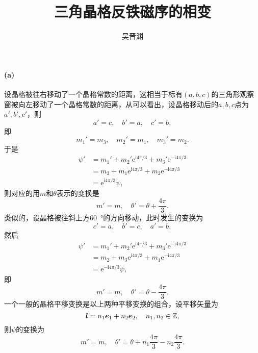 \documentclass[hyperref, UTF8, a4paper]{ctexart}
\title{三角晶格反铁磁序的相变}
\author{吴晋渊}
\newcommand*{\ii}{\mathrm{i}}
\newcommand*{\ee}{\mathrm{e}}
\begin{document}
\maketitle

\paragraph{(a)} 设晶格被往右移动了一个晶格常数的距离，这相当于标有$(a, b, c)$的三角形观察窗被向左移动了一个晶格常数的距离，从可以看出，设晶格移动后的$a, b, c$点为$a', b', c'$，则
\[
    a' = c, \quad b' = a, \quad c' = b,
\]
即
\[
    m_1' = m_3, \quad m_2' = m_1, \quad m_3' = m_2.
\]
于是
\[
    \begin{aligned}
        \psi' &= m_1' + m_2' \ee^{\ii 4 \pi / 3} + m_3' \ee^{- \ii 4 \pi / 3} \\
        &= m_3 + m_1 \ee^{\ii 4 \pi / 3} + m_2 \ee^{- \ii 4 \pi / 3} \\
        &= \ee^{\ii 4 \pi / 3} \psi,
    \end{aligned}
\]
则对应的用$m$和$\theta$表示的变换是
\begin{equation}
    m' = m, \quad \theta' = \theta + \frac{4\pi}{3}.
    \label{eq:cyc1}
\end{equation}
类似的，设晶格被往斜上方\SI{60}{\degree}的方向移动，此时发生的变换为
\[
    c' = a, \quad b' = c, \quad a' = b,
\]
然后
\[
    \begin{aligned}
        \psi' &= m_1' + m_2' \ee^{\ii 4 \pi / 3} + m_3' \ee^{- \ii 4 \pi / 3} \\
        &= m_2 + m_3 \ee^{\ii 4 \pi / 3} + m_1 \ee^{- \ii 4 \pi / 3} \\
        &= \ee^{- \ii 4 \pi / 3} \psi,
    \end{aligned} 
\] 
即
\begin{equation}
    m' = m, \quad \theta' = \theta - \frac{4\pi}{3}.
    \label{eq:cyc2}
\end{equation}
一个一般的晶格平移变换是以上两种平移变换的组合，设平移矢量为
\begin{equation}
    \vb*{l} = n_1 \vb*{e}_1 + n_2 \vb*{e}_2, \quad n_1, n_2 \in \mathbb{Z},
\end{equation}
则$\psi$的变换为
\begin{equation}
    m' = m, \quad \theta' = \theta + n_1 \frac{4 \pi}{3} - n_2 \frac{4\pi}{3}.
    \label{eq:transition}
\end{equation}
\end{document}
